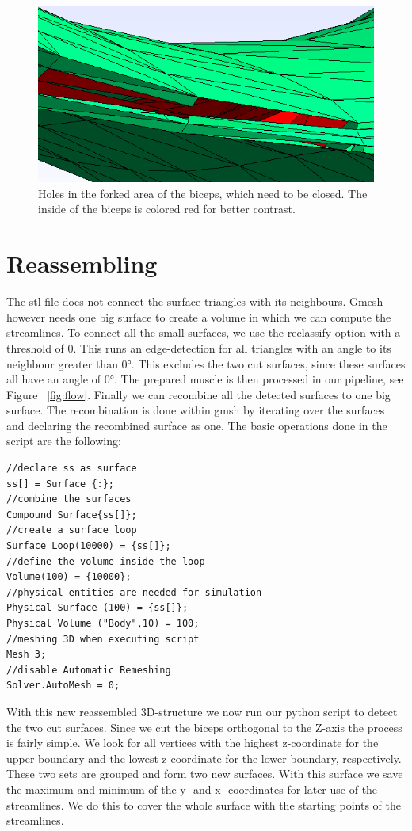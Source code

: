 \documentclass[preprint,journal]{vgtc}       %
\begin{document}
\begin{figure}
	\begin{center}
		\includegraphics[width = .6\linewidth]{holes.png}
	\end{center}
	\caption{Holes in the forked area of the biceps, which need to be closed. The inside of the biceps is colored red for better contrast.}
	\label{fig:holes}
\end{figure}

\section{Reassembling}
The stl-file does not connect the surface triangles with its neighbours. Gmesh however needs one big surface to create a volume in which we can compute the streamlines. To connect all the small surfaces, we use the reclassify option with a threshold of 0. This runs an edge-detection for all triangles with an angle to its neighbour greater than 0°. This excludes the two cut surfaces, since these surfaces all have an angle of 0°. The prepared muscle is then processed in our pipeline, see Figure ~\ref{fig:flow}. Finally we can recombine all the detected surfaces to one big surface. The recombination is done within gmsh by iterating over the surfaces and declaring the recombined surface as one. The basic operations done in the script are the following:

\begin{verbatim}
//declare ss as surface
ss[] = Surface {:};
//combine the surfaces
Compound Surface{ss[]};
//create a surface loop
Surface Loop(10000) = {ss[]};
//define the volume inside the loop
Volume(100) = {10000};
//physical entities are needed for simulation
Physical Surface (100) = {ss[]};
Physical Volume ("Body",10) = 100;
//meshing 3D when executing script
Mesh 3;
//disable Automatic Remeshing
Solver.AutoMesh = 0;
\end{verbatim}

With this new reassembled 3D-structure we now run our python script to detect the two cut surfaces. Since we cut the biceps orthogonal to the Z-axis the process is fairly simple. We look for all vertices with the highest z-coordinate for the upper boundary and the lowest z-coordinate for the lower boundary, respectively. These two sets are grouped and form two new surfaces. With this surface we save the maximum and minimum of the y- and x- coordinates for later use of the streamlines. We do this to cover the whole surface with the starting points of the streamlines.
\end{document}
